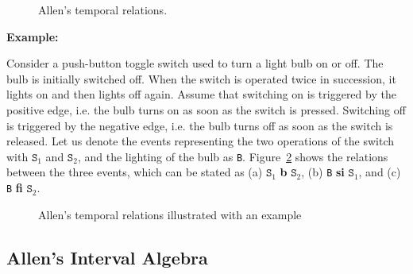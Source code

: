 \begin{figure}[htbp!]
\centerline{
}
\caption{Allen's temporal relations.}
\label{fig:clock:Allen}
\end{figure}

\vspace{2mm}

\noindent
{\bf Example:}

\noindent
Consider a push-button toggle switch used to turn a light bulb on or off. The bulb is initially switched off. When the
switch is operated twice in succession, it lights on and then lights off again. Assume that switching on is triggered 
by the positive edge, i.e. the bulb turns on as soon as the switch is pressed. Switching off is triggered by the negative edge, 
i.e. the bulb turns off as soon as the switch is released. 
%
Let us denote the events representing the two operations of the switch with $\texttt{S}_1$ and $\texttt{S}_2$, and the lighting 
of the bulb as \texttt{B}. Figure~\ref{fig:clock:Allen-example} shows the relations between the three events, which can be stated 
as (a) $\texttt{S}_1$ {\bf b} $\texttt{S}_2$, (b) \texttt{B} {\bf si} $\texttt{S}_1$, and (c) \texttt{B} {\bf fi}  $\texttt{S}_2$.


\begin{figure}[htbp!]
\centerline{
}
\caption{Allen's temporal relations illustrated with an example}
\label{fig:clock:Allen-example}
\end{figure}


\subsection{Allen's Interval Algebra}
\label{sec:clock:Allen-algebra}

